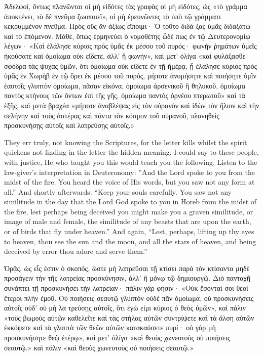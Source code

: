 \documentclass[10pt]{book}
\newcommand{\switchGreek}[1][]{\selectlanguage{polutonikogreek} \switchcolumn*[#1]}
\newcommand{\switchEnglish}{\selectlanguage{english} \switchcolumn}
\begin{document}
\begin{paracol}{2}
\switchGreek

Ἀδελφοί, ὄντως πλανῶνται οἱ μὴ εἰδότες τὰς γραφὰς οἱ μὴ εἰδότες, ὡς «τὸ γράμμα ἀποκτένει, τὸ δὲ πνεῦμα ζωοποιεῖ», οἱ μὴ ἐρευνῶντες τὸ ὑπὸ τῷ γράμματι κεκρυμμένον πνεῦμα.
Πρὸς οὓς ἂν ἀξίως εἴποιμι· Ὁ τοῦτο διδά ξας ὑμᾶς διδαξάτω καὶ τὸ ἑπόμενον.
Μάθε, ὅπως ἑρμηνεύει ὁ νομοθέτης ὧδέ πως ἐν τῷ Δευτερονομίῳ λέγων· «Καὶ ἐλάλησε κύριος πρὸς ὑμᾶς ἐκ μέσου τοῦ πυρός· φωνὴν ῥημάτων ὑμεῖς ἠκούσατε καὶ ὁμοίωμα οὐκ εἴδετε, ἀλλ’ ἢ φωνήν», καὶ μετ’ ὀλίγα «καὶ φυλάξασθε σφόδρα τὰς ψυχὰς ὑμῶν, ὅτι ὁμοίωμα οὐκ εἴδετε ἐν τῇ ἡμέρᾳ, ᾗ ἐλάλησε κύριος πρὸς ὑμᾶς ἐν Χωρὴβ ἐν τῷ ὄρει ἐκ μέσου τοῦ πυρός, μήποτε ἀνομήσητε καὶ ποιήσητε ὑμῖν ἑαυτοῖς γλυπτὸν ὁμοίωμα, πᾶσαν εἰκόνα, ὁμοίωμα ἀρσενικοῦ ἢ θηλυκοῦ, ὁμοίωμα παντὸς κτήνους τῶν ὄντων ἐπὶ τῆς γῆς, ὁμοίωμα παντὸς ὀρνέου πτερωτοῦ» καὶ τὰ ἑξῆς, καὶ μετὰ βραχέα «μήποτε ἀναβλέψας εἰς τὸν οὐρανὸν καὶ ἰδὼν τὸν ἥλιον καὶ τὴν σελήνην καὶ τοὺς ἀστέρας καὶ πάντα τὸν κόσμον τοῦ οὐρανοῦ, πλανηθεὶς προσκυνήσῃς αὐτοῖς καὶ λατρεύσῃς αὐτοῖς.»

\switchEnglish

They err truly, not knowing the Scriptures, 
for the letter kills whilst the spirit quickens\textemdash
not finding in the letter the hidden meaning. 
I could say to these people, with justice, He 
who taught you this would teach you the 
following. Listen to the law-giver's interpretation in Deuteronomy: ''And the Lord spoke 
to you from the midst of the fire. You heard 
the voice of His words, but you saw not any 
form at all.'' And shortly afterwards: ``Keep 
your souls carefully. You saw not any similitude in the day that the Lord God spoke to 
you in Horeb from the midst of the fire, lest 
perhaps being deceived you might make you a 
graven similitude, or image of male and female, 
the similitude of any beasts that are upon the 
earth, or of birds that fly under heaven.'' And 
again, ``Lest, perhaps, lifting up thy eyes to 
heaven, thou see the sun and the moon, and 
all the stars of heaven, and being deceived by 
error thou adore and serve them.'' 

\switchGreek

Ὁρᾷς, ὡς εἷς ἐστιν ὁ σκοπός, ὥστε μὴ λατρεῦσαι τῇ κτίσει παρὰ τὸν κτίσαντα μηδὲ προσάγειν τὴν τῆς λατρείας προσκύνησιν, ἀλλ’ ἢ μόνῳ τῷ δημιουργῷ.
Διὸ πανταχῆ συνάπτει τῇ προσκυνήσει τὴν λατρείαν· πάλιν γάρ φησιν· «Οὐκ ἔσονταί σοι θεοὶ ἕτεροι πλὴν ἐμοῦ.
Οὐ ποιήσεις σεαυτῷ γλυπτὸν οὐδὲ πᾶν ὁμοίωμα, οὐ προσκυνήσεις αὐτοῖς οὐδ’ οὐ μὴ λα τρεύσῃς αὐτοῖς, ὅτι ἐγώ εἰμι κύριος ὁ θεὸς ὑμῶν», καὶ πάλιν «τοὺς βωμοὺς αὐτῶν καθελεῖτε καὶ τὰς στήλας αὐτῶν συντρίψετε καὶ τὰ ἄλση αὐτῶν ἐκκόψετε καὶ τὰ γλυπτὰ τῶν θεῶν αὐτῶν κατακαύσετε πυρί· οὐ γὰρ μὴ προσκυνήσητε θεῷ ἑτέρῳ», καὶ μετ’ ὀλίγα «καὶ θεοὺς χωνευτοὺς οὐ ποιήσεις σεαυτῷ.»
καὶ πάλιν «καὶ θεοὺς χωνευτοὺς οὐ ποιήσεις σεαυτῷ.»


\end{paracol}
\end{document}
